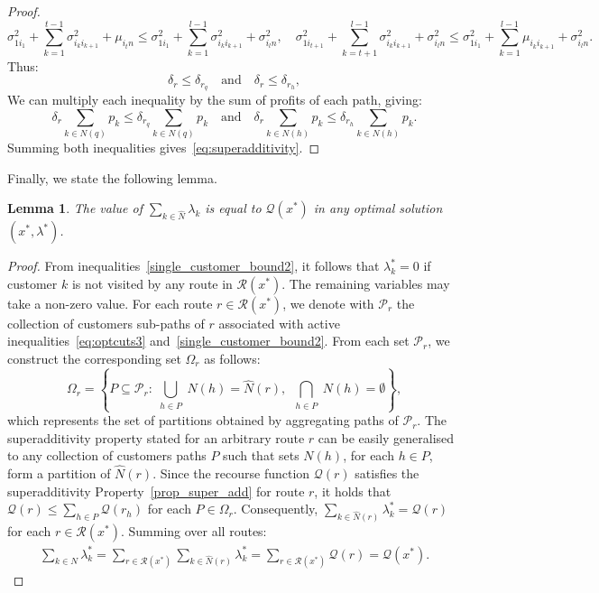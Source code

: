 \documentclass[11pt]{article}
\newtheorem{lemma}[theorem]{Lemma}
\theoremstyle{definition}
\begin{document}
\begin{proof}
  \begin{equation*}
  \sigma^2_{1i_1} + \sum_{k=1}^{t-1} \sigma^2_{i_k i_{k+1}} + \mu_{i_t n} \leq \sigma^2_{1i_1} + \sum_{k=1}^{l-1} \sigma^2_{i_k i_{k+1}} + \sigma^2_{i_l n}, \quad \sigma^2_{1i_{t+1}} + \sum_{k=t+1}^{l-1} \sigma^2_{i_k i_{k+1}} + \sigma^2_{i_l n} \leq \sigma^2_{1i_1} + \sum_{k=1}^{l-1} \mu_{i_k i_{k+1}} + \sigma^2_{i_l n}.
  \end{equation*}
  Thus:
  \[
  \delta_r \leq \delta_{r_q} \quad \text{and} \quad \delta_r \leq \delta_{r_h},
  \]
  We can multiply each inequality by the sum of profits of each path, giving:
  \[
  \delta_r \sum_{k \in N(q)} p_k \leq \delta_{r_q} \sum_{k \in N(q)} p_k \quad \text{and} \quad \delta_r \sum_{k \in N(h)} p_k \leq \delta_{r_h} \sum_{k \in N(h)} p_k.
  \]
  Summing both inequalities gives~\eqref{eq:superadditivity}.
\end{proof}

\noindent Finally, we state the following lemma.

\begin{lemma}
 The value of $\sum_{k \in \hat{N}} \lambda_k$ is equal to $\mathcal{Q}(x^*)$ in any optimal solution $(x^*, \lambda^*)$.
 \label{lem:optcuts3}
\end{lemma}

\begin{proof}
  From inequalities~\eqref{single_customer_bound2}, it follows that $\lambda^*_k = 0$ if customer $k$ is not visited by any route in $\mathcal{R}(x^*)$. The remaining variables may take a non-zero value. For each route $r \in \mathcal{R}(x^*)$, we denote with $\mathcal{P}_r$ the collection of customers sub-paths of $r$ associated with active inequalities~\eqref{eq:optcuts3} and~\eqref{single_customer_bound2}.
  From each set $\mathcal{P}_r$, we construct the corresponding set $\Omega_r$ as follows:
  \[
  \Omega_r = \left\{ P \subseteq \mathcal{P}_r : \bigcup_{\substack{h \in P}} N(h) = \hat N(r),\ \bigcap_{\substack{h \in P}} N(h) = \emptyset \right\},
  \]
  which represents the set of partitions obtained by aggregating paths of $\mathcal{P}_r$.
  The superadditivity property stated for an arbitrary route $r$ can be easily generalised to any collection of customers paths $P$ such that sets $N(h)$, for each $h \in P$, form a partition of $\hat N(r)$.
  Since the recourse function $\mathcal{Q}(r)$ satisfies the superadditivity Property~\ref{prop_super_add} for route $r$, it holds that $\mathcal{Q}(r) \leq \sum_{h \in P} \mathcal Q(r_h)$ for each $P \in \Omega_r$.
  Consequently, $\sum_{k \in \hat{N}(r)} \lambda_k^* = \mathcal{Q}(r)$ for each $r \in \mathcal{R}(x^*)$.
  Summing over all routes:
  \begin{align*}
  \sum_{k \in N} \lambda_k^* =
  \sum_{r \in \mathcal{R}(x^*)}
  \sum_{k \in \hat N(r)} \lambda_k^* =
  \sum_{r \in \mathcal{R}(x^*)}
  \mathcal{Q}(r) =
  \mathcal{Q}(x^*).
  \end{align*}
\end{proof}
\end{document}

